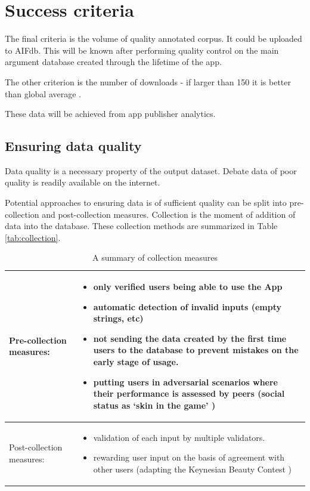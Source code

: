 \documentclass{report}
\begin{document}
\section{Success criteria}
The final criteria is the volume of quality annotated corpus. It could be uploaded to AIFdb. 
This will be known after performing quality control on the main argument database created through the lifetime of the app. 

The other criterion is the number of downloads - if larger than 150 it is better than global average \cite{noauthor_average_nodate}.

These data will be achieved from app publisher analytics.

\subsection{Ensuring data quality}
Data quality is a necessary property of the output dataset. Debate data of poor quality is readily available on the internet.

Potential approaches to ensuring data is of sufficient quality can be split into pre-collection and post-collection measures. Collection is the moment of addition of data into the database. These collection methods are summarized in Table \ref{tab:collection}.

  \begin{table}[h!]
      \centering
      \begin{center}
        
    \begin{tabular}{|l|p{8cm}|}

\toprule
Pre-collection measures:  & \begin{itemize}[left=0pt,topsep=0pt]\item only verified users being able to use the App
  \item automatic detection of invalid inputs (empty strings, etc)
  \item not sending the data created by the first time users to the database to prevent mistakes on the early stage of usage.
  \item putting users in adversarial scenarios where their performance is assessed by peers (social status as `skin in the game' \cite{noauthor_have_2023})
\end{itemize} \\
\midrule

 Post-collection measures:  & \begin{itemize}[left=0pt,topsep=0pt]
  \item validation of each input by multiple validators.  
  \item rewarding user input on the basis of agreement with other users (adapting the Keynesian Beauty Contest \cite{keynes_general_1935})

\end{itemize} \\
\bottomrule
    \end{tabular}
      \end{center}
    \caption{A summary of collection measures}

 \end{table}\label{tab:collection}
\end{document}
